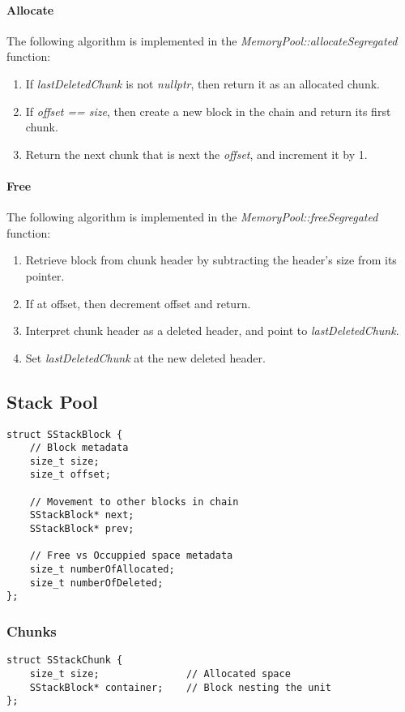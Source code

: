 \documentclass[a4paper, 12pt]{article}
\begin{document}
\paragraph{Allocate}
The following algorithm is implemented in the \textit{MemoryPool::allocateSegregated} function:

\begin{enumerate}
    \item If \textit{lastDeletedChunk} is not \textit{nullptr}, then return it as an allocated chunk.
    \item If \textit{offset == size}, then create a new block in the chain and return its first chunk.
    \item Return the next chunk that is next the \textit{offset}, and increment it by 1.
\end{enumerate}

\paragraph{Free}
The following algorithm is implemented in the \textit{MemoryPool::freeSegregated} function:

\begin{enumerate}
    \item Retrieve block from chunk header by subtracting the header's size from its pointer.
    \item If at offset, then decrement offset and return.
    \item Interpret chunk header as a deleted header, and point to \textit{lastDeletedChunk}.
    \item Set \textit{lastDeletedChunk} at the new deleted header.
\end{enumerate}


\subsection{Stack Pool}
\begin{verbatim}
struct SStackBlock {
    // Block metadata
    size_t size;
    size_t offset;

    // Movement to other blocks in chain
    SStackBlock* next;
    SStackBlock* prev;

    // Free vs Occuppied space metadata
    size_t numberOfAllocated;
    size_t numberOfDeleted;
};
\end{verbatim}

\subsubsection{Chunks}
\begin{verbatim}
struct SStackChunk {
    size_t size;               // Allocated space
    SStackBlock* container;    // Block nesting the unit
};
\end{verbatim}
\end{document}
